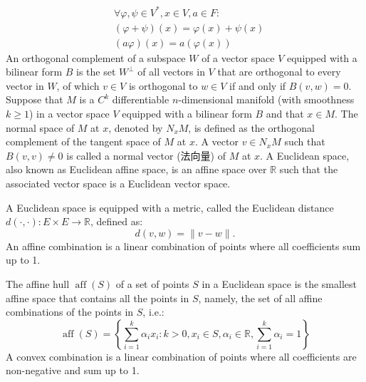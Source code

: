 \documentclass[a4paper,12pt]{report}
\begin{document}
\[\begin{aligned}
&\forall\varphi ,\psi \in V^*,x\in V,a\in F:\\
&(\varphi+\psi)(x)=\varphi (x)+\psi (x)\\
&(a\varphi )(x)=a\left(\varphi (x)\right)
\end{aligned}\]
An orthogonal complement of a subspace $W$ of a vector space $V$ equipped with a bilinear form $B$ is the set $W^{\perp }$ of all vectors in $V$ that are orthogonal to every vector in $W$, of which $v\in V$ is orthogonal to $w\in V$ if and only if $B(v,w)=0$.
Suppose that $M$ is a $C^k$ differentiable $n$-dimensional manifold (with smoothness $k\geq 1$) in a vector space $V$ equipped with a bilinear form $B$ and that $x\in M$. The normal space of $M$ at $x$, denoted by $N_xM$, is defined as the orthogonal complement of the tangent space of $M$ at $x$. A vector $v\in N_xM$ such that $B(v,v)\neq 0$ is called a normal vector (法向量) of $M$ at $x$.
A Euclidean space, also known as Euclidean affine space, is an affine space over $\mathbb{R}$ such that the associated vector space is a Euclidean vector space.

A Euclidean space is equipped with a metric, called the Euclidean distance $d(\cdot,\cdot)\colon E\times E\to\mathbb{R}$, defined as:
\[d(v,w)=\|v-w\|.\]
An affine combination is a linear combination of points where all coefficients sum up to 1.

The affine hull $\operatorname{aff} (S)$ of a set of points $S$ in a Euclidean space is the smallest affine space that contains all the points in $S$, namely, the set of all affine combinations of the points in $S$, i.e.:
\[\operatorname{aff}(S)=\left\{\sum _{i=1}^k\alpha _ix_i\colon k>0,x_i\in S,\alpha _i\in\mathbb{R},\sum _{i=1}^k\alpha _i=1\right\}\]
A convex combination is a linear combination of points where all coefficients are non-negative and sum up to 1.
\end{document}

